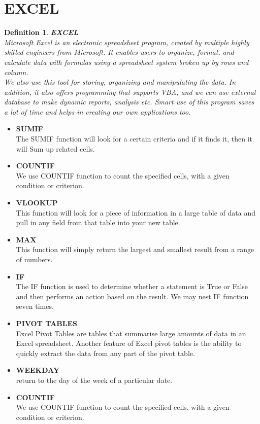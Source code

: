 \documentclass{book}
\newtheorem{definition}{Definition}[section]
\begin{document}
\section{EXCEL}
\begin{definition}\textbf{EXCEL}\\
Microsoft Excel is an electronic spreadsheet program, created by multiple highly skilled engineers from Microsoft. It enables users to organize, format, and calculate data with formulas using a spreadsheet system broken up by rows and column.\\
We also use this tool for storing, organizing and manipulating the data. In addition, it also offers programming that supports VBA, and we can use external database to make dynamic reports, analysis etc. Smart use of this program saves a lot of time and helps in creating our own applications too. 
\end{definition}
\begin{itemize}
\item \textbf{SUMIF}\\
The SUMIF function will look for a certain criteria and if it finds it, then it will Sum up related cells.\\
\item \textbf{COUNTIF}\\
We use COUNTIF function to count the specified cells, with a given condition or criterion.
\item \textbf{VLOOKUP}\\
This function will look for a piece of information in a large table of data and pull in any field from that table into your new table.\\
\item \textbf{MAX}\\
This function will simply return the largest and smallest result from a range of numbers. \\
\item \textbf{IF}\\
The IF function is used to determine whether a statement is True or False and then performs an action based on the result. We may nest IF function seven times.\\
\item \textbf{PIVOT TABLES}\\
Excel Pivot Tables are tables that summarise large amounts of data in an Excel spreadsheet. Another feature of Excel pivot tables is the ability to quickly extract the data from any part of the pivot table.\\
\item \textbf{WEEKDAY}\\
return to the day of the week of a particular date.	
\item \textbf{COUNTIF}\\
We use COUNTIF function to count the specified cells, with a given condition or
criterion.
\end{itemize}
\end{document}
